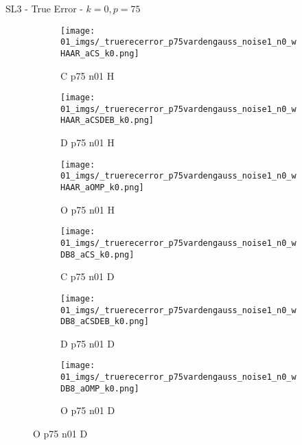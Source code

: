 \begin{frame}{SL3 - True Error - $k=0,p=75$}{}
\begin{figure}
\begin{subfigure}{0.13\textwidth}
\texttt{[image: 01\_imgs/\_truerecerror\_p75vardengauss\_noise1\_n0\_wHAAR\_aCS\_k0.png]}
\caption*{\tiny C p75 n01 H}
\end{subfigure}
\begin{subfigure}{0.13\textwidth}
\texttt{[image: 01\_imgs/\_truerecerror\_p75vardengauss\_noise1\_n0\_wHAAR\_aCSDEB\_k0.png]}
\caption*{\tiny D p75 n01 H}
\end{subfigure}
\begin{subfigure}{0.13\textwidth}
\texttt{[image: 01\_imgs/\_truerecerror\_p75vardengauss\_noise1\_n0\_wHAAR\_aOMP\_k0.png]}
\caption*{\tiny O p75 n01 H}
\end{subfigure}
\begin{subfigure}{0.13\textwidth}
\texttt{[image: 01\_imgs/\_truerecerror\_p75vardengauss\_noise1\_n0\_wDB8\_aCS\_k0.png]}
\caption*{\tiny C p75 n01 D}
\end{subfigure}
\begin{subfigure}{0.13\textwidth}
\texttt{[image: 01\_imgs/\_truerecerror\_p75vardengauss\_noise1\_n0\_wDB8\_aCSDEB\_k0.png]}
\caption*{\tiny D p75 n01 D}
\end{subfigure}
\begin{subfigure}{0.13\textwidth}
\texttt{[image: 01\_imgs/\_truerecerror\_p75vardengauss\_noise1\_n0\_wDB8\_aOMP\_k0.png]}
\caption*{\tiny O p75 n01 D}
\end{subfigure}

\vspace{5pt}


\end{figure}
\end{frame}
